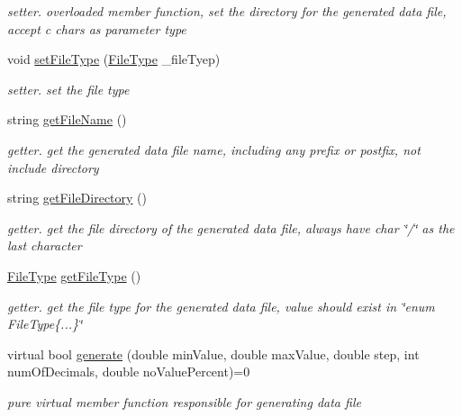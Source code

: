 \begin{DoxyCompactItemize}
\begin{DoxyCompactList}\small\item\em setter. overloaded member function, set the directory for the generated data file, accept c chars as parameter type \end{DoxyCompactList}\item 
\hypertarget{classDataGenerator_af9b368a1ea6e6a0622c691d7ccadae12}{void \hyperlink{classDataGenerator_af9b368a1ea6e6a0622c691d7ccadae12}{set\-File\-Type} (\hyperlink{FileType_8h_a2c794c5c13ab4dd7e65bad031dbe41c3}{\-File\-Type} \-\_\-file\-Tyep)}\label{classDataGenerator_af9b368a1ea6e6a0622c691d7ccadae12}

\begin{DoxyCompactList}\small\item\em setter. set the file type \end{DoxyCompactList}\item 
\hypertarget{classDataGenerator_acae2a977b7525af309433978c8dee9de}{string \hyperlink{classDataGenerator_acae2a977b7525af309433978c8dee9de}{get\-File\-Name} ()}\label{classDataGenerator_acae2a977b7525af309433978c8dee9de}

\begin{DoxyCompactList}\small\item\em getter. get the generated data file name, including any prefix or postfix, not include directory \end{DoxyCompactList}\item 
\hypertarget{classDataGenerator_addc30af98e4f589ff9b1b04d03cbef9a}{string \hyperlink{classDataGenerator_addc30af98e4f589ff9b1b04d03cbef9a}{get\-File\-Directory} ()}\label{classDataGenerator_addc30af98e4f589ff9b1b04d03cbef9a}

\begin{DoxyCompactList}\small\item\em getter. get the file directory of the generated data file, always have char \char`\"{}/\char`\"{} as the last character \end{DoxyCompactList}\item 
\hypertarget{classDataGenerator_ab4505d83948a30240c83c42d42f79e01}{\hyperlink{FileType_8h_a2c794c5c13ab4dd7e65bad031dbe41c3}{\-File\-Type} \hyperlink{classDataGenerator_ab4505d83948a30240c83c42d42f79e01}{get\-File\-Type} ()}\label{classDataGenerator_ab4505d83948a30240c83c42d42f79e01}

\begin{DoxyCompactList}\small\item\em getter. get the file type for the generated data file, value should exist in \char`\"{}enum File\-Type\{...\}\char`\"{} \end{DoxyCompactList}\item 
virtual bool \hyperlink{classDataGenerator_a58deadd2230db351b03c85d2f8f0a5d6}{generate} (double min\-Value, double max\-Value, double step, int num\-Of\-Decimals, double no\-Value\-Percent)=0
\begin{DoxyCompactList}\small\item\em pure virtual member function responsible for generating data file \end{DoxyCompactList}\end{DoxyCompactItemize}
